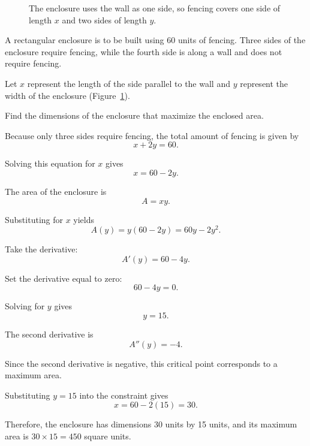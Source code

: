 \begin{figure}[H]
\centering
{}
\caption{The enclosure uses the wall as one side, so fencing covers one side of length $x$ and two sides of length $y$.}
\label{fig:fence-enclosure}
\end{figure}

\begin{Exercise}[label = optimization2]
A rectangular enclosure is to be built using 60 units of fencing. Three
sides of the enclosure require fencing, while the fourth side is along
a wall and does not require fencing.

Let $x$ represent the length of the side parallel to the wall and $y$
represent the width of the enclosure (Figure~\ref{fig:fence-enclosure}).

Find the dimensions of the enclosure that maximize the enclosed area.
\end{Exercise}

\begin{Answer}[ref=optimization2]

Because only three sides require fencing, the total amount of fencing is
given by
\[
x + 2y = 60.
\]

Solving this equation for $x$ gives
\[
x = 60 - 2y.
\]

The area of the enclosure is
\[
A = xy.
\]

Substituting for $x$ yields
\[
A(y) = y(60 - 2y) = 60y - 2y^2.
\]

Take the derivative:
\[
A'(y) = 60 - 4y.
\]

Set the derivative equal to zero:
\[
60 - 4y = 0.
\]

Solving for $y$ gives
\[
y = 15.
\]

The second derivative is
\[
A''(y) = -4.
\]

Since the second derivative is negative, this critical point corresponds
to a maximum area.

Substituting $y = 15$ into the constraint gives
\[
x = 60 - 2(15) = 30.
\]

Therefore, the enclosure has dimensions 30 units by 15 units, and its maximum area is $30 \times 15 = 450$ square units.
\end{Answer}

